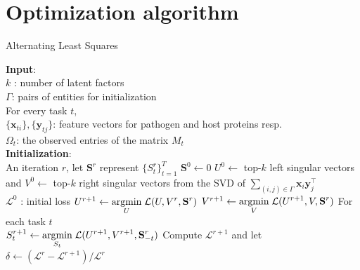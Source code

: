\documentclass[a4paper,11pt]{article}
\newcommand{\argmin}{\operatornamewithlimits{argmin}}
\begin{document}


\section{Optimization algorithm}

\begin{algorithm}[!h]   \caption{Alternating Least Squares}
   \label{alg}
   \begin{small}
\begin{algorithmic}[1]
\STATE \textbf{Input}: \\
$k$ : number of latent factors\\
$\Gamma$: pairs of entities for initialization\\
For every task $t$,\\
${\{\mathbf{x}_{ti}\}, \{\mathbf{y}_{tj}\}}$: feature vectors for pathogen and host proteins resp.\\
$\Omega_t$: the observed entries of the matrix $M_t$\\
\STATE \textbf{Initialization}: \\
\STATE An iteration $r$, let $\mathbf{S}^r$ represent $\{S^r_t\}_{t=1}^T$
\STATE $\mathbf{S}^0 \leftarrow 0$
\STATE $U^0 \leftarrow$ top-$k$ left singular vectors and $V^0 \leftarrow$ top-$k$ right singular vectors from the SVD of $\displaystyle{\sum_{(i,j) \in \Gamma}} \mathbf{x}_i \mathbf{y}_j^\intercal$\\
\STATE $\mathcal{L}^0$ : initial loss
\REPEAT
  \STATE $U^{r+1} \leftarrow \displaystyle{\argmin_{U}} \; \mathcal{L}(U, V^r, \mathbf{S}^r)$  \STATE $V^{r+1} \leftarrow \displaystyle{\argmin_{V}} \; \mathcal{L}(U^{r+1}, V, \mathbf{S}^r) $  \STATE For each task $t$\\
  \hspace{0.5cm} $S^{r+1}_t \leftarrow \displaystyle{\argmin_{S_t}} \; \mathcal{L}(U^{r+1}, V^{r+1}, \mathbf{S}^r_{-t}) $
  \STATE Compute $\mathcal{L}^{r+1}$ and let $\delta \leftarrow (\mathcal{L}^r - \mathcal{L}^{r+1})/\mathcal{L}^r$
\UNTIL {$\delta < \tau$}%
\end{algorithmic}\end{small}
\end{algorithm}
\end{document}
